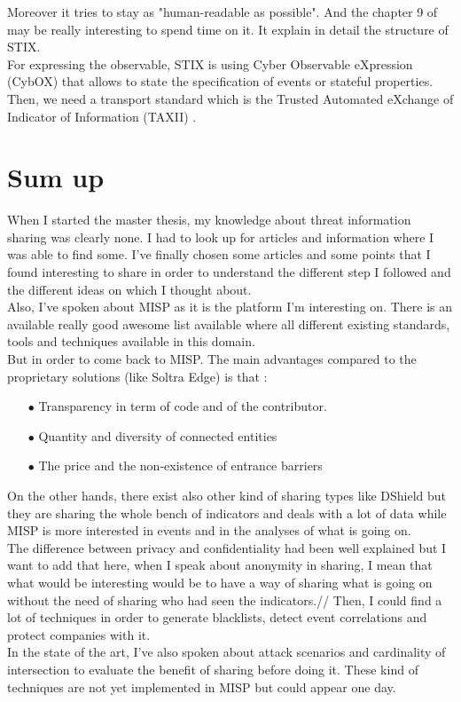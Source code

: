 \documentclass{eplmastersthesis}
\begin{document}
 Moreover it tries to stay as "human-readable as possible". And the chapter 9 of \cite{barnum2012standardizing} may be really interesting to spend time on it. It explain in detail the structure of STIX.\\
 For expressing the observable, STIX is using Cyber Observable eXpression (CybOX)\cite{barnum2012cybox} that allows to state the specification of events or stateful properties.
Then, we need a transport standard which is the Trusted Automated eXchange of Indicator of Information (TAXII) \cite{connolly2014trusted} .


\section{Sum up}
When I started the master thesis, my knowledge about threat information sharing was clearly none. I had to look up for articles and information where I was able to find some. I've finally chosen some articles and some points that I found interesting to share in order to understand the different step I followed and the different ideas on which I thought about.\\
Also, I've spoken about MISP as it is the platform I'm interesting on. There is an available really good awesome list \cite{AwesomeTreat} available where all different existing standards, tools and techniques available in this domain.\\
But in order to come back to MISP. The main advantages compared to the proprietary solutions (like Soltra Edge) is that :
\begin{itemize}
\item[$\bullet$] Transparency in term of code and of the contributor.
\item[$\bullet$] Quantity and diversity of connected entities
\item[$\bullet$] The price and the non-existence of entrance barriers
\end{itemize}
On the other hands, there exist also other kind of sharing types like DShield but they are sharing the whole bench of indicators and deals with a lot of data while MISP is more interested in events and in the analyses of what is going on.\\

The difference between privacy and confidentiality had been well explained but I want to add that here, when I speak about anonymity in sharing, I mean that what would be interesting would be to have a way of sharing what is going on without the need of sharing who had seen the indicators.//
Then, I could find a lot of techniques in order to generate blacklists, detect event correlations and protect companies with it.\\
In the state of the art, I've also spoken about attack scenarios and cardinality of intersection to evaluate the benefit of sharing before doing it. These kind of techniques are not yet implemented in MISP but could appear one day.\\
\end{document}
